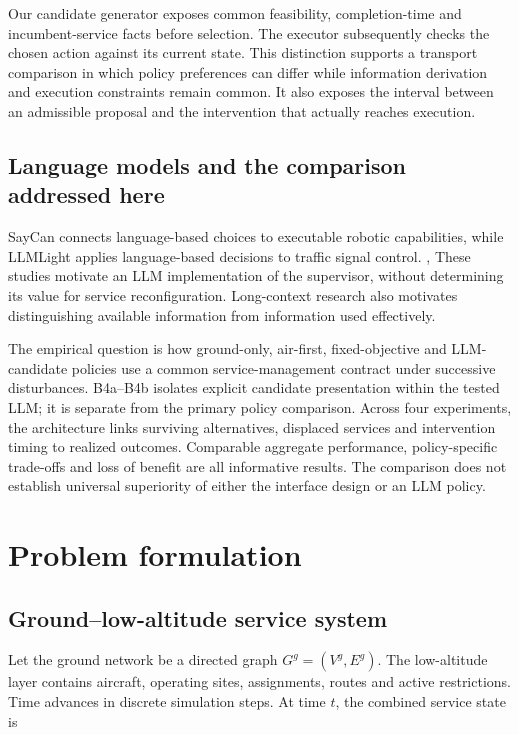 \documentclass[]{interact}
\theoremstyle{plain}
\theoremstyle{definition}
\theoremstyle{remark}
\begin{document}
Our candidate generator exposes common feasibility, completion-time and incumbent-service facts before selection. The executor subsequently checks the chosen action against its current state. This distinction supports a transport comparison in which policy preferences can differ while information derivation and execution constraints remain common. It also exposes the interval between an admissible proposal and the intervention that actually reaches execution.

\subsection{Language models and the comparison addressed here}

SayCan connects language-based choices to executable robotic capabilities, while LLMLight applies language-based decisions to traffic signal control. \citep{ref9}, \citep{ref10} These studies motivate an LLM implementation of the supervisor, without determining its value for service reconfiguration. Long-context research also motivates distinguishing available information from information used effectively. \citep{ref11}

The empirical question is how ground-only, air-first, fixed-objective and LLM-candidate policies use a common service-management contract under successive disturbances. B4a--B4b isolates explicit candidate presentation within the tested LLM; it is separate from the primary policy comparison. Across four experiments, the architecture links surviving alternatives, displaced services and intervention timing to realized outcomes. Comparable aggregate performance, policy-specific trade-offs and loss of benefit are all informative results. The comparison does not establish universal superiority of either the interface design or an LLM policy.

\section{Problem formulation}

\subsection{Ground--low-altitude service system}

Let the ground network be a directed graph $G^g=(V^g,E^g)$. The low-altitude layer contains aircraft, operating sites, assignments, routes and active restrictions. Time advances in discrete simulation steps. At time $t$, the combined service state is
\end{document}
